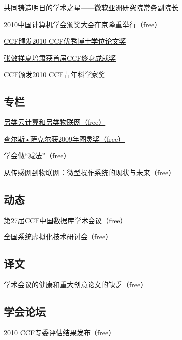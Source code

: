 \documentclass[a4paper]{article}
\begin{document}
\href{http://history.ccf.org.cn/resources/1190201776262/2011/02/16/3.pdf}{共同铸造明日的学术之星——微软亚洲研究院常务副院长}

\href{http://history.ccf.org.cn/resources/1190201776262/2011/02/16/1.pdf}{2010中国计算机学会颁奖大会在京隆重举行（free）}

\href{http://history.ccf.org.cn/resources/1190201776262/2011/02/16/6.pdf}{CCF颁发2010 CCF优秀博士学位论文奖}

\href{http://history.ccf.org.cn/resources/1190201776262/2011/02/16/4.pdf}{张效祥夏培肃获首届CCF终身成就奖}

\href{http://history.ccf.org.cn/resources/1190201776262/2011/02/16/5.pdf}{CCF颁发2010 CCF青年科学家奖}

\subsection{专栏}
\href{http://history.ccf.org.cn/resources/1190201776262/2011/02/16/14.pdf}{另类云计算和另类物联网（free）}

\href{http://history.ccf.org.cn/resources/1190201776262/2011/02/16/16.pdf}{查尔斯•萨克尔获2009年图灵奖（free）}

\href{http://history.ccf.org.cn/resources/1190201776262/2011/02/16/17.pdf}{学会做“减法”（free）}

\href{http://history.ccf.org.cn/resources/1190201776262/2011/02/16/15.pdf}{从传感网到物联网：微型操作系统的现状与未来（free）}

\subsection{动态}
\href{http://history.ccf.org.cn/resources/1190201776262/2011/02/16/18.pdf}{第27届CCF中国数据库学术会议（free）}

\href{http://history.ccf.org.cn/resources/1190201776262/2011/02/16/19.pdf}{全国系统虚拟化技术研讨会（free）}

\subsection{译文}
\href{http://history.ccf.org.cn/resources/1190201776262/2011/02/16/20.pdf}{学术会议的健康和重大创意论文的缺乏（free）}

\subsection{学会论坛}
\href{http://history.ccf.org.cn/resources/1190201776262/2011/02/16/23.pdf}{2010 CCF专委评估结果发布（free）}
\end{document}

